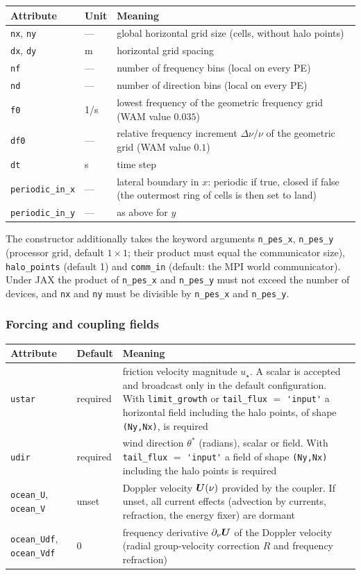 \documentclass[12pt]{article}
\renewcommand{\v}[1]{{\mbox{\boldmath$ #1 $}}}  %
\newcommand{\p}{{\partial}}
\begin{document}
\begin{longtable}{@{}llp{8.6cm}@{}}
\hline
Attribute & Unit & Meaning \\
\hline
\endhead
\verb|nx|, \verb|ny| & --- & global horizontal grid size (cells, without halo
  points) \\
\verb|dx|, \verb|dy| & m & horizontal grid spacing \\
\verb|nf| & --- & number of frequency bins (local on every PE) \\
\verb|nd| & --- & number of direction bins (local on every PE) \\
\verb|f0| & 1/s & lowest frequency of the geometric frequency grid (WAM value
  $0.035$) \\
\verb|df0| & --- & relative frequency increment $\Delta \nu/\nu$ of the
  geometric grid (WAM value $0.1$) \\
\verb|dt| & s & time step \\
\verb|periodic_in_x| & --- & lateral boundary in $x$: periodic if true, closed
  if false (the outermost ring of cells is then set to land) \\
\verb|periodic_in_y| & --- & as above for $y$ \\
\hline
\end{longtable}

\noindent
The constructor additionally takes the keyword arguments \verb|n_pes_x|,
\verb|n_pes_y| (processor grid, default $1\times 1$; their product must equal
the communicator size), \verb|halo_points| (default 1) and \verb|comm_in|
(default: the MPI world communicator).
Under JAX the product of \verb|n_pes_x| and \verb|n_pes_y| must not exceed the number
of devices, and \verb|nx| and \verb|ny| must be divisible by \verb|n_pes_x| and \verb|n_pes_y|.

\subsubsection*{Forcing and coupling fields}

\begin{longtable}{@{}llp{8.6cm}@{}}
\hline
Attribute & Default & Meaning \\
\hline
\endhead
\verb|ustar| & required & friction velocity magnitude $u_\star$. A scalar is
  accepted and broadcast only in the default configuration. With
  \verb|limit_growth| or \verb|tail_flux| $=$ \verb|'input'| a horizontal
  field including the halo points, of shape \verb|(Ny,Nx)|, is required \\
\verb|udir| & required & wind direction $\theta^*$ (radians), scalar or
  field. With \verb|tail_flux| $=$ \verb|'input'| a field of shape
  \verb|(Ny,Nx)| including the halo points is required \\
\verb|ocean_U|, \verb|ocean_V| & unset & Doppler velocity $\v U(\nu)$ provided
  by the coupler. If unset, all current effects (advection by currents,
  refraction, the energy fixer) are dormant \\
\verb|ocean_Udf|, \verb|ocean_Vdf| & $0$ & frequency derivative
  $\p_\nu \v U$ of the Doppler velocity (radial group-velocity correction
  $R$ and frequency refraction) \\
\hline
\end{longtable}
\end{document}
